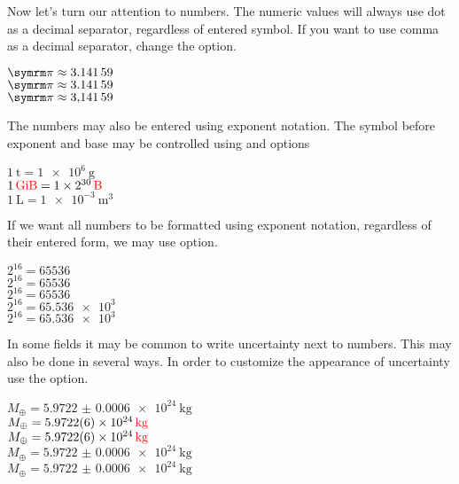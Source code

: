 Now let's turn our attention to numbers. The numeric values will always use dot
as a decimal separator, regardless of entered symbol. If you want to use comma
as a decimal separator, change the  option.
\begin{example}
\NewDocumentCommand{\cpi}{}{\symrm{\pi}} %
\(\cpi \approx \num{3.14159}\)
\\ %
\(\cpi \approx \num{3,14159}\)
\\ %
\(\cpi \approx \num[
  output-decimal-marker={,}
]{3.14159}\)
\end{example}

The numbers may also be entered using exponent notation. The symbol before
exponent and base may be controlled using  and
 options
\begin{example}
\(\qty{1}{\tonne} 
  = \qty{1e6}{\g}\) \\
\(\qty{1}{\gibi\byte} = \qty[
  exponent-base = 2,
]{1e30}{\byte}\) \\
\(\qty{1}{\L} = \qty[
  exponent-product = \cdot,
]{1e-3}{\cubic\m}\)
\end{example}

If we want all numbers to be formatted using exponent notation, regardless of
their entered form, we may use  option.
\begin{example}
\(2^{16} = \num{65536}\) \\
\(2^{16} = \num[
  exponent-mode = scientific,
]{65536}\) \\
\(2^{16} = \num[
  exponent-mode = engineering,
]{65536}\) \\
\(2^{16} = \num[
  exponent-mode = fixed,
]{65.536e3}\) \\
\(2^{16} = \num[
  exponent-mode = fixed,
  fixed-exponent = 5,
]{65.536e3}\)
\end{example}

In some fields it may be common to write uncertainty next to numbers. This may
also be done in several ways. In order to customize the appearance of
uncertainty use the  option.
\begin{example}
\(M_{\oplus} = \qty{
  5.9722(6) e24}{\kg}\)
  \\ %
\(M_{\oplus} = \qty{
  5.9722 +- 0.0006 e24}{\kg}\)
  \\ %
\(M_{\oplus} = \qty{
  5.9722 \pm 0.0006 e24}{\kg}\)
  \\ %
\(M_{\oplus} = \qty[
    uncertainty-mode = separate
  ]{5.9722(6) e24}{\kg}\)
  \\ %
\(M_{\oplus} = \qty[
  uncertainty-mode = full
]{5.9722(6) e24}{\kg}\)
\end{example}

